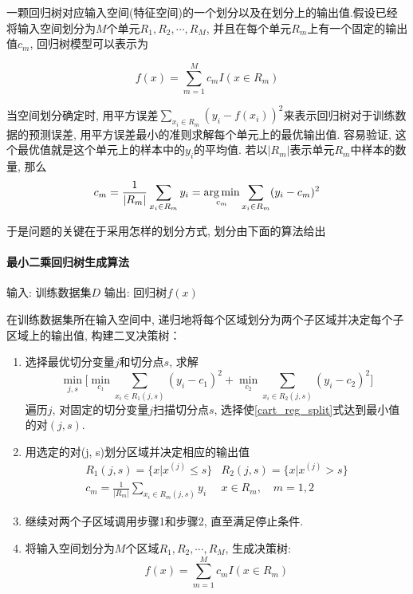 一颗回归树对应输入空间(特征空间)的一个划分以及在划分上的输出值.假设已经将输入空间划分为$M$个单元$R_1,R_2,\cdots,R_M$, 并且在每个单元$R_m$上有一个固定的输出值$c_m$, 回归树模型可以表示为

\begin{equation*}
    f(x) = \sum_{m=1}^Mc_mI(x\in R_m)
\end{equation*}

当空间划分确定时, 用平方误差$\sum_{x_i\in R_m}(y_i - f(x_i))^2$来表示回归树对于训练数据的预测误差, 用平方误差最小的准则求解每个单元上的最优输出值. 容易验证, 这个最优值就是这个单元上的样本中的$y_i$的平均值. 若以$|R_m|$表示单元$R_m$中样本的数量, 那么
\begin{equation*}
    c_m = \frac{1}{|R_m|} \sum_{x_i\in R_m}y_i = \operatorname*{arg\,min}_{c_m}\sum_{x_i\in R_m}(y_i - c_m)^2
\end{equation*}

于是问题的关键在于采用怎样的划分方式, 划分由下面的算法给出

\paragraph{最小二乘回归树生成算法}

输入: 训练数据集$D$
输出: 回归树$f(x)$

在训练数据集所在输入空间中, 递归地将每个区域划分为两个子区域并决定每个子区域上的输出值, 构建二叉决策树：

\begin{enumerate}
    \item 选择最优切分变量$j$和切分点$s$, 求解
          \begin{equation}\label{cart_reg_split}
              \min_{j,s}\Bigg[ \min_{c_1}\sum_{x_i\in R_1(j, s)}(y_i - c_1)^2 + \min_{c_2}\sum_{x_i\in R_2(j, s)}(y_i - c_2)^2 \Bigg]
          \end{equation}
          遍历$j$, 对固定的切分变量$j$扫描切分点$s$, 选择使\ref{cart_reg_split}式达到最小值的对$(j, s)$.
    \item 用选定的对(j, s)划分区域并决定相应的输出值
          \begin{equation*}
              \begin{array}{rl}
                  R_1(j,s) = \{x|x^{(j)} \leq s\}                 & R_2(j,s) = \{x|x^{(j)} > s\} \\
                  c_m = \frac{1}{|R_m|} \sum_{x_i\in R_m(j,s)}y_i & x \in R_m,\quad m=1,2
              \end{array}
          \end{equation*}
    \item 继续对两个子区域调用步骤1和步骤2, 直至满足停止条件.
    \item 将输入空间划分为$M$个区域$R_1,R_2,\cdots,R_M$, 生成决策树:
          \begin{equation*}
              f(x) = \sum_{m=1}^Mc_mI(x\in R_m)
          \end{equation*}
\end{enumerate}

